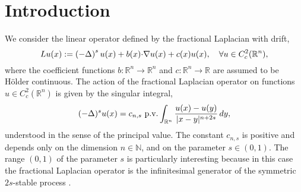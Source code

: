 \documentclass[11pt,reqno]{amsart}
\theoremstyle{definition}
\theoremstyle{remark}
\begin{document}
\section{Introduction}
\label{sec:Intro}
We consider the linear operator defined by the fractional Laplacian with drift,
\begin{equation}
\label{eq:Operator}
Lu(x) : = \left(-\Delta\right)^s u(x) + b(x){\hbox{$\cdot$}}\nabla u (x)+c(x) u(x),\quad \forall u \in C^{2}_c({\mathbb{R}}^n),
\end{equation}
where the coefficient functions $b:{\mathbb{R}}^n\rightarrow{\mathbb{R}}^n$ and $c:{\mathbb{R}}^n\rightarrow{\mathbb{R}}$ are assumed to be H\"older continuous.
The action of the fractional Laplacian operator on functions $u\in C^2_c({\mathbb{R}}^n)$ is given by the singular integral,
\begin{equation*}
(-\Delta)^s u(x) = c_{n,s} \hbox{ p.v.} \int_{{\mathbb{R}}^n}\frac{u(x)-u(y)}{|x-y|^{n+2s}}\, dy,
\end{equation*}
understood in the sense of the principal value. The constant $c_{n,s}$ is positive and depends only on the dimension $n\in {\mathbb{N}}$, and on the parameter $s\in (0,1)$. The range $(0,1)$ of the parameter $s$ is particularly interesting because in this case the fractional Laplacian operator is the infinitesimal generator of the symmetric $2s$-stable process \cite[Example 3.3.8]{Applebaum}.
\end{document}
